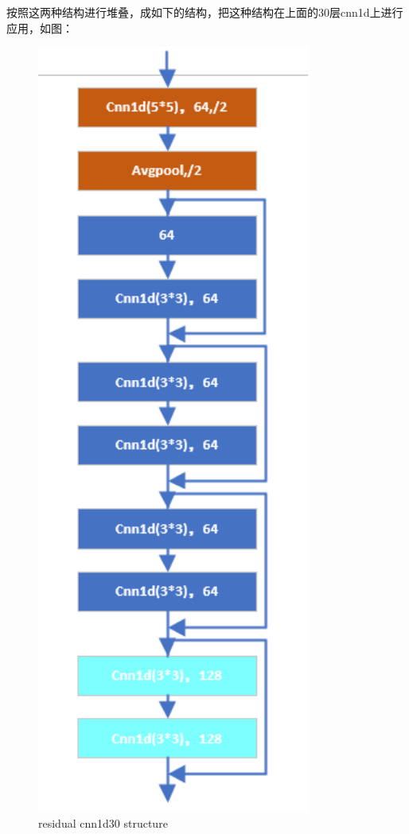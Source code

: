 \documentclass[11pt]{ctexart}
\begin{document}
按照这两种结构进行堆叠，成如下的结构，把这种结构在上面的30层cnn1d上进行应用，如图：
\begin{figure}[H]

\begin{center}
\includegraphics[width=0.8\textwidth]{residual3.PNG}
\end{center}
\caption{residual cnn1d30 structure}
\label{FIG.3}
\end{figure}
\end{document}

